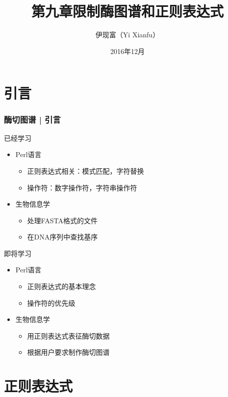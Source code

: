 


\title[限制酶图谱和正则表达式]{第九章\quad 限制酶图谱和正则表达式}
\author[Yixf]{伊现富（Yi Xianfu）}
\date{2016年12月}



\section{引言}
\begin{frame}
  \frametitle{酶切图谱 | 引言}
  \begin{block}{已经学习}
    \begin{itemize}
      \item Perl语言
	\begin{itemize}
	  \item 正则表达式相关：模式匹配，字符替换
	  \item 操作符：数字操作符，字符串操作符
	\end{itemize}
      \item 生物信息学
	\begin{itemize}
	  \item 处理FASTA格式的文件
	  \item 在DNA序列中查找基序
	\end{itemize}
    \end{itemize}
  \end{block}
  \pause
  \begin{block}{即将学习}
    \begin{itemize}
      \item Perl语言
	\begin{itemize}
	  \item 正则表达式的基本理念
	  \item 操作符的优先级
	\end{itemize}
      \item 生物信息学
	\begin{itemize}
	  \item 用正则表达式表征酶切数据
	  \item 根据用户要求制作酶切图谱
	\end{itemize}
    \end{itemize}
  \end{block}
\end{frame}

\section{正则表达式}
